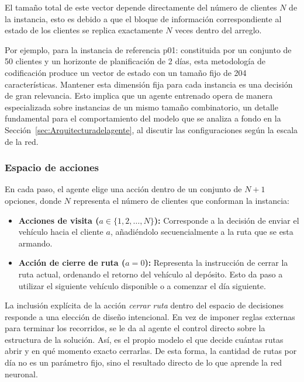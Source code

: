 El tamaño total de este vector depende directamente del número de clientes $N$ de la instancia, esto es debido a que el bloque de información correspondiente al estado de los clientes se replica exactamente $N$ veces dentro del arreglo.

Por ejemplo, para la instancia de referencia p01: constituida por un conjunto de 50 clientes y un horizonte de planificación de 2 días, esta metodología de codificación produce un vector de estado con un tamaño fijo de 204 características. Mantener esta dimensión fija para cada instancia es una decisión de gran relevancia. Esto implica que un agente entrenado opera de manera especializada sobre instancias de un mismo tamaño combinatorio, un detalle fundamental para el comportamiento del modelo que se analiza a fondo en la Sección~\ref{sec:Arquitecturadelagente}, al discutir las configuraciones según la escala de la red.

\subsubsection{Espacio de acciones} \label{sec:Espaciodeacciones}

En cada paso, el agente elige una acción dentro de un conjunto de $N+1$ opciones, donde $N$ representa el número de clientes que conforman la instancia:

\begin{itemize}
    \item \textbf{Acciones de visita ($a \in \{1, 2, \dots, N\}$):} Corresponde a la decisión de enviar el vehículo hacia el cliente $a$, añadiéndolo secuencialmente a la ruta que se esta armando.

    \item \textbf{Acción de cierre de ruta ($a = 0$):} Representa la instrucción de cerrar la ruta actual, ordenando el retorno del vehículo al depósito.  Esto da paso a utilizar el siguiente vehículo disponible o a comenzar el día siguiente.
\end{itemize}

La inclusión explícita de la acción \textit{cerrar ruta} dentro del espacio de decisiones responde a una elección de diseño intencional. En vez de imponer reglas externas para terminar los recorridos, se le da al agente el control directo sobre la estructura de la solución. Así, es el propio modelo el que decide cuántas rutas abrir y en qué momento exacto cerrarlas. De esta forma, la cantidad de rutas por día no es un parámetro fijo, sino el resultado directo de lo que aprende la red neuronal.

